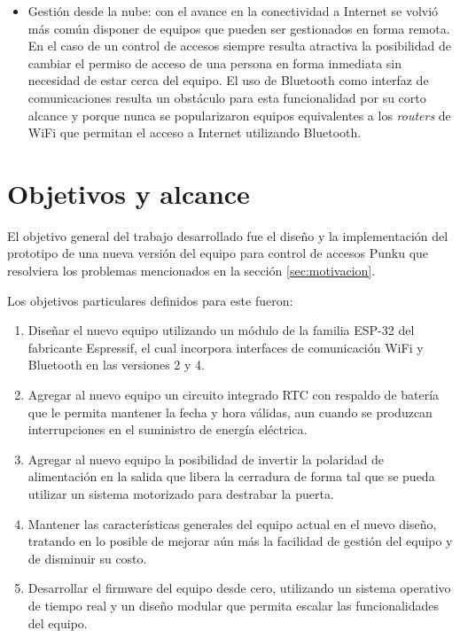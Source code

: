 \begin{itemize}
	\item Gestión desde la nube: con el avance en la conectividad a Internet se volvió más común disponer de equipos que pueden ser gestionados en forma remota. En el caso de un control de accesos siempre resulta atractiva la posibilidad de cambiar el permiso de acceso de una persona en forma inmediata sin necesidad de estar cerca del equipo. El uso de Bluetooth como interfaz de comunicaciones resulta un obstáculo para esta funcionalidad por su corto alcance y porque nunca se popularizaron equipos equivalentes a los \emph{routers} de WiFi que permitan el acceso a Internet utilizando Bluetooth.
\end{itemize}

\section{Objetivos y alcance}
\label{sec:objetivos}

El objetivo general del trabajo desarrollado fue el diseño y la implementación del prototipo de una nueva versión del equipo para control de accesos Punku que resolviera los problemas mencionados en la sección \ref{sec:motivacion}. 

Los objetivos particulares definidos para este fueron:

\begin{enumerate}
	\item Diseñar el nuevo equipo utilizando un módulo de la familia ESP-32 del fabricante Espressif, el cual incorpora interfaces de comunicación WiFi y Bluetooth en las versiones 2 y 4.
	
	\item Agregar al nuevo equipo un circuito integrado RTC con respaldo de batería que le permita mantener la fecha y hora válidas, aun cuando se produzcan interrupciones en el suministro de energía eléctrica.
	
	\item Agregar al nuevo equipo la posibilidad de invertir la polaridad de alimentación en la salida que libera la cerradura de forma tal que se pueda utilizar un sistema motorizado para destrabar la puerta.
	
	\item Mantener las características generales del equipo actual en el nuevo diseño, tratando en lo posible de mejorar aún más la facilidad de gestión del equipo y de disminuir su costo.
	
	\item Desarrollar el firmware del equipo desde cero, utilizando un sistema operativo de tiempo real y un diseño modular que permita escalar las funcionalidades del equipo.
\end{enumerate}

